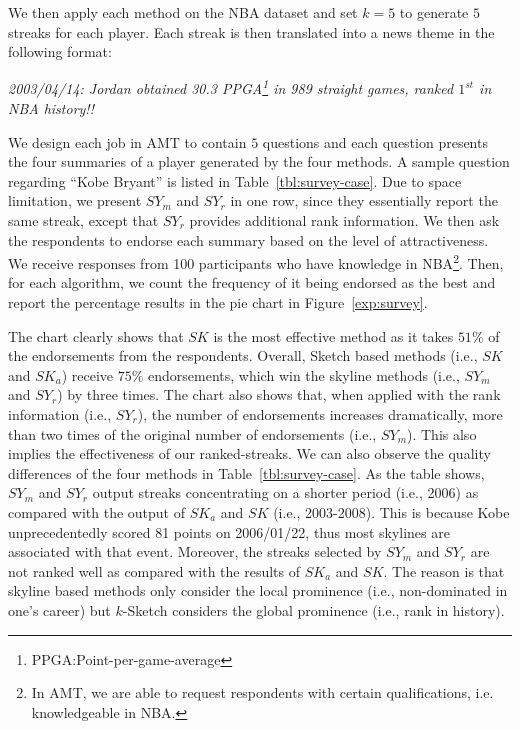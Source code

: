 We then apply each method on the NBA dataset and set $k=5$ to generate $5$ streaks 
for each player. 
Each streak is then translated into a news theme in the following format:

\textit{2003/04/14: Jordan obtained 30.3 PPGA\footnote{PPGA:Point-per-game-average} in 989 straight games, ranked $1^{st}$ in NBA history!!}

We design each job in AMT to contain $5$ questions and each question
presents the four summaries of a player generated by the four methods. 
A sample question regarding ``Kobe Bryant''
is listed in Table~\ref{tbl:survey-case}. 
Due to space limitation, we present $SY_m$ and $SY_r$ in one row, since they
essentially report the same streak, except that $SY_r$ provides additional rank information.
We then ask the respondents to endorse each summary based on the level of attractiveness.
We receive responses from 100 participants who have knowledge in 
NBA\footnote{In AMT, we are able to request respondents with 
certain qualifications, i.e. knowledgeable in NBA.}. 
Then, for each algorithm, we count the frequency of it being endorsed as the best
and report the percentage results in the pie chart in Figure~\ref{exp:survey}. 

The chart clearly shows that $SK$ is the most effective method as
it takes $51\%$ of the endorsements from the respondents. Overall,
Sketch based methods (i.e., $SK$ and $SK_a$) receive $75\%$ endorsements,
which win the skyline methods (i.e., $SY_m$ and $SY_r$) by three times.
The chart also shows that, when applied with the rank information (i.e., $SY_r$),
the number of endorsements increases dramatically,
more than two times of the original number of endorsements (i.e., $SY_m$).
This also implies the effectiveness of our ranked-streaks.
We can also observe the quality differences of the four methods in Table~\ref{tbl:survey-case}. 
As the table shows, $SY_m$ and $SY_r$ output
streaks concentrating on a shorter period (i.e., 2006) as compared
with the output of $SK_a$ and $SK$ (i.e., 2003-2008).
This is because Kobe unprecedentedly scored 81 points on 2006/01/22, thus most skylines
are associated with that event.
Moreover,
the streaks selected by $SY_m$ and $SY_r$ are not ranked well as compared with
the results of $SK_a$ and $SK$. The reason is that skyline based methods only
consider the local prominence (i.e., non-dominated in one's career) but $k$-Sketch considers
the global prominence (i.e., rank in history).

